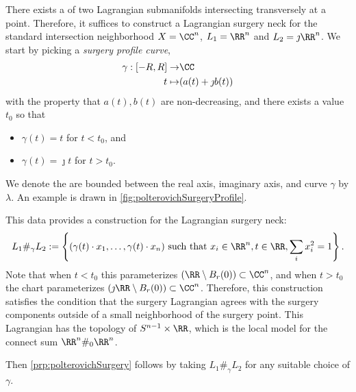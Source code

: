 
 
 

There exists a  of two Lagrangian submanifolds intersecting transversely at a point. Therefore, it suffices to construct a Lagrangian surgery neck for the standard intersection neighborhood $X=\CC^n$, $L_1=\RR^n$ and $L_2=\jmath\RR^n$.
We start by picking a \emph{surgery profile curve},  
\begin{align*}
      \gamma: [-R, R] \to& \CC\\
      t\mapsto& (a(t)+\jmath b(t))
\end{align*}
with the property that $a(t), b(t)$ are non-decreasing, and there exists a value $t_0$ so that 
\begin{itemize}
      \item  $\gamma(t)=t$ for $t< t_0$, and
      \item  $\gamma(t)=\jmath t$ for $t>t_0$.
\end{itemize}
We denote the are bounded between the real axis, imaginary axis, and curve $\gamma$ by $\lambda$.
An example is drawn in \cref{fig:polterovichSurgeryProfile}.

This data provides a construction for the Lagrangian surgery neck:
\[
	L_1\#_\gamma L_2:=\left\{(\gamma(t)\cdot x_1,\ldots,  \gamma(t)\cdot x_n) \text{ such that } x_i \in \RR^n,t\in \RR, \sum_{i} x_i^2=1\right\}.
\]
Note that when $t < t_0$ this parameterizes $(\RR\setminus B_r(0))\subset \CC^n$, and when $t > t_0$ the chart parameterizes $(\jmath \RR \setminus B_r(0))\subset \CC^n$. 
Therefore, this construction satisfies the condition that the surgery Lagrangian agrees with the surgery components outside of a small neighborhood of the surgery point.
This Lagrangian has the topology of $S^{n-1}\times \RR$, which is the local model for the connect sum $\RR^n\#_0\RR^n$.


Then \cref{prp:polterovichSurgery} follows by taking $L_1\#_\gamma L_2$ for any suitable choice of $\gamma$.
 